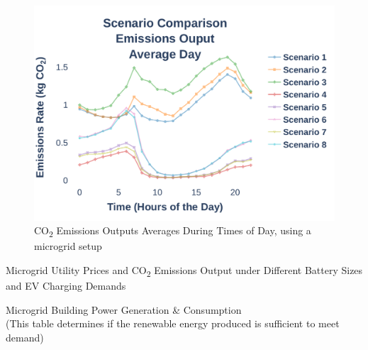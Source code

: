 \documentclass[conference,  usletter]{IEEEtran}
\begin{document}
\begin{figure}
\centering
\includegraphics[width=1\linewidth]{Fig/Option_3/emissions_scenario_comparison_run_3_large_font.pdf}
\caption{\footnotesize  CO\textsubscript{2} Emissions Outputs Averages During Times of Day, using a microgrid setup}
\label{fig:emissionsscenariocomparison}
\end{figure}
\begin{table}
\caption{Microgrid Utility Prices and CO\textsubscript{2} Emissions Output under Different Battery Sizes and EV Charging Demands}
\centering
\begin{adjustbox}{max width=\textwidth}

\end{adjustbox}
\normalsize
\label{tab:emissions}
\end{table}	
\begin{table}
\centering
\caption{\centering Microgrid Building Power Generation \& Consumption \\  \centering (This table determines if the renewable energy produced is sufficient to meet demand)}
\begin{adjustbox}{max width=\textwidth}

\end{adjustbox}
\label{tab:gen_load_level_2_level_3}
\end{table}	
\end{document}
